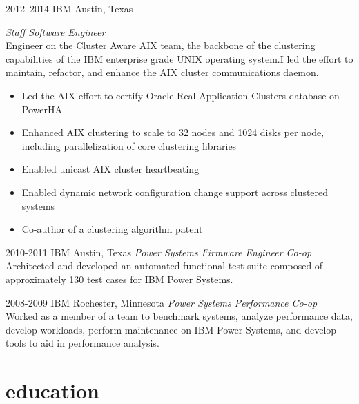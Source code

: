 \documentclass{friggeri-cv} %
\begin{document}
\begin{entrylist}
\entry
{2012--2014}
{IBM}
{Austin, Texas}
{\emph{Staff Software Engineer} \\
Engineer on the Cluster Aware AIX team, the backbone of the clustering capabilities of the IBM enterprise grade UNIX operating system.I led the effort to maintain, refactor, and enhance the AIX cluster communications daemon. \\
\begin{itemize}
\item Led the AIX effort to certify Oracle Real Application Clusters database on PowerHA
\item Enhanced AIX clustering to scale to 32 nodes and 1024 disks per node, including parallelization of core clustering libraries
\item Enabled unicast AIX cluster heartbeating
\item Enabled dynamic network configuration change support across clustered systems
\item Co-author of a clustering algorithm patent 
\end{itemize}}
\end{entrylist}
\begin{entrylist}
\entry
{2010-2011}
{IBM}
{Austin, Texas}
{\emph{Power Systems Firmware Engineer Co-op} \\
Architected and developed an automated functional test suite composed of approximately 130 test cases for IBM Power Systems.}
\end{entrylist}
\begin{entrylist}
\entry
{2008-2009}
{IBM}
{Rochester, Minnesota}
{\emph{Power Systems Performance Co-op} \\
Worked as a member of a team to benchmark systems, analyze performance data, develop workloads, perform
maintenance on IBM Power Systems, and develop tools to aid in performance analysis. }
\end{entrylist}


\section{education}
\end{document}

